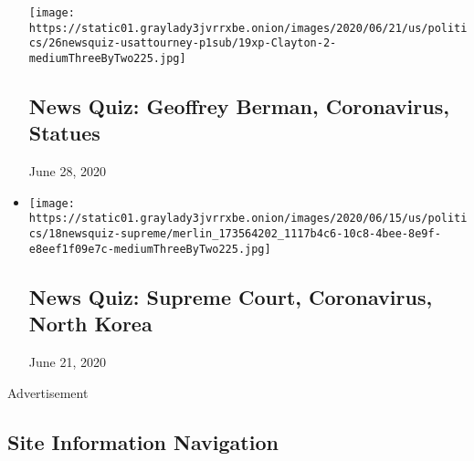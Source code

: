 \begin{itemize}
  \texttt{[image: https://static01.graylady3jvrrxbe.onion/images/2020/06/21/us/politics/26newsquiz-usattourney-p1sub/19xp-Clayton-2-mediumThreeByTwo225.jpg]}

  \hypertarget{news-quiz-geoffrey-berman-coronavirus-statues}{%
  \subsection{News Quiz: Geoffrey Berman, Coronavirus,
  Statues}\label{news-quiz-geoffrey-berman-coronavirus-statues}}

  June 28, 2020
\item
  \href{https://www.nytimes3xbfgragh.onion/interactive/2020/06/19/briefing/supreme-court-coronavirus-north-korea-news-quiz.html}{}

  \texttt{[image: https://static01.graylady3jvrrxbe.onion/images/2020/06/15/us/politics/18newsquiz-supreme/merlin\_173564202\_1117b4c6-10c8-4bee-8e9f-e8eef1f09e7c-mediumThreeByTwo225.jpg]}

  \hypertarget{news-quiz-supreme-court-coronavirus-north-korea}{%
  \subsection{News Quiz: Supreme Court, Coronavirus, North
  Korea}\label{news-quiz-supreme-court-coronavirus-north-korea}}

  June 21, 2020
\end{itemize}

Advertisement

\hypertarget{site-information-navigation}{%
\subsection{Site Information
Navigation}\label{site-information-navigation}}

